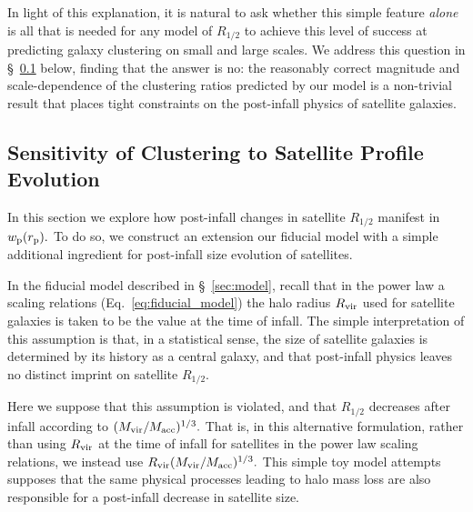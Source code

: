 \documentclass[usenatbib,usegraphicx,letterpaper]{mn2e}
\newcommand{\rhalf}{R_{1/2}}
\newcommand{\mvir}{M_{\rm vir}}
\newcommand{\macc}{M_{\rm acc}}
\newcommand{\rvir}{R_{\rm vir}}
\newcommand{\rproj}{r_{\rm p}}
\newcommand{\wproj}{w_{\rm p}}
\begin{document}
In light of this explanation, it is natural to ask whether this simple feature {\em alone} is all that is needed for any model of $\rhalf$ to achieve this level of success at predicting galaxy clustering on small and large scales. We address this question in \S~\ref{subsec:tests2} below, finding that the answer is no: the reasonably correct magnitude and scale-dependence of the clustering ratios predicted by our model is a non-trivial result that places tight constraints on the post-infall physics of satellite galaxies.

\subsection{Sensitivity of Clustering to Satellite Profile Evolution}
\label{subsec:tests2}

In this section we explore how post-infall changes in satellite $\rhalf$ manifest in $\wproj(\rproj).$ To do so, we construct an extension our fiducial model with a simple additional ingredient for post-infall size evolution of satellites.

In the fiducial model described in \S~\ref{sec:model}, recall that in the power law a scaling relations (Eq.~\ref{eq:fiducial_model}) the halo radius $\rvir$ used for satellite galaxies is taken to be the value at the time of infall. The simple interpretation of this assumption is that, in a statistical sense, the size of satellite galaxies is determined by its history as a central galaxy, and that post-infall physics leaves no distinct imprint on satellite $\rhalf.$

Here we suppose that this assumption is violated, and that $\rhalf$ decreases after infall according to $(\mvir/\macc)^{1/3}.$ That is, in this alternative formulation, rather than using $\rvir$ at the time of infall for satellites in the power law scaling relations, we instead use $\rvir(\mvir/\macc)^{1/3}.$ This simple toy model attempts supposes that the same physical processes leading to halo mass loss are also responsible for a post-infall decrease in satellite size.
\end{document}
